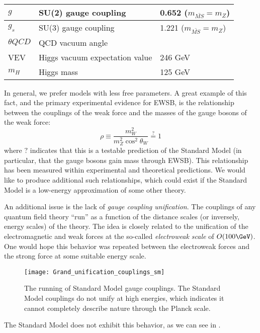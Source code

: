 \begin{table}
\begin{tabular}{| l | l | l |}
$g$               & SU(2) gauge coupling           & 0.652     ($m_{\bar{MS}} = m_Z$)                         \\ \hline
$g_s$             & SU(3) gauge coupling           & 1.221     ($m_{\bar{MS}} = m_Z$)                         \\ \hline
$\theta{QCD}$     & QCD vacuum angle               & \order 0                          \\ \hline
VEV               & Higgs vacuum expectation value & 246 GeV                           \\ \hline
$m_H$             & Higgs mass                     & 125 GeV                           \\ \hline
\end{tabular}
\end{table}
In general, we prefer models with less free parameters.
A great example of this fact, and the primary experimental evidence for EWSB, is the relationship between the couplings of the weak force and the masses of the gauge bosons of the weak force:
\begin{equation}
\rho \equiv \frac{m_W^2}{m_Z^2 \cos^2 \theta_W } \stackrel{?}{=} 1
\end{equation}
where $?$ indicates that this is a testable prediction of the Standard Model (in particular, that the gauge bosons gain mass through EWSB).
This relationship has been measured  within experimental and theoretical predictions.
We would like to produce additional such relationships, which could exist if the Standard Model is a low-energy approximation of some other theory.

An additional issue is the lack of \textit{gauge coupling unification}.
The couplings of any quantum field theory ``run'' as a function of the distance scales (or inversely, energy scales) of the theory.
The idea is closely related to the unification of the electromagnetic and weak forces at the so-called \textit{electroweak scale} of $O(100 \GeV)$.
One would hope this behavior was repeated between the electroweak forces and the strong force at some suitable energy scale.
\begin{figure}[tbp]
\caption{The running of Standard Model gauge couplings.  The Standard Model couplings do not unify at high energies, which indicates it cannot completely describe nature through the Planck scale.} \label{fig:sm_gauge_coupling}
\texttt{[image: Grand\_unification\_couplings\_sm]}
\end{figure}
The Standard Model does not exhibit this behavior, as we can see in .

